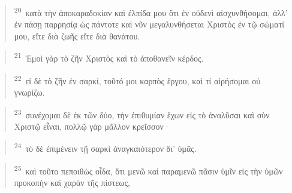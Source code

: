 \documentclass{article}
\newcommand{\currentverse}{1} %
\newcommand{\setcurrentverse}[1]{\renewcommand{\currentverse}{#1}}
\begin{document}
\begin{verse}

\setcurrentverse{20}

\setcounter{footnote}{0}

\textsuperscript{20}~κατὰ τὴν ἀποκαραδοκίαν καὶ ἐλπίδα μου ὅτι ἐν οὐδενὶ αἰσχυνθήσομαι, ἀλλ’ ἐν πάσῃ παρρησίᾳ ὡς πάντοτε καὶ νῦν μεγαλυνθήσεται Χριστὸς ἐν τῷ σώματί μου, εἴτε διὰ ζωῆς εἴτε διὰ θανάτου.

\end{verse}

\begin{verse}

\setcurrentverse{21}

\setcounter{footnote}{0}

\textsuperscript{21}~Ἐμοὶ γὰρ τὸ ζῆν Χριστὸς καὶ τὸ ἀποθανεῖν κέρδος.

\end{verse}

\begin{verse}

\setcurrentverse{22}

\setcounter{footnote}{0}

\textsuperscript{22}~εἰ δὲ τὸ ζῆν ἐν σαρκί, τοῦτό μοι καρπὸς ἔργου, καὶ τί αἱρήσομαι οὐ γνωρίζω.

\end{verse}

\begin{verse}

\setcurrentverse{23}

\setcounter{footnote}{0}

\textsuperscript{23}~συνέχομαι δὲ ἐκ τῶν δύο, τὴν ἐπιθυμίαν ἔχων εἰς τὸ ἀναλῦσαι καὶ σὺν Χριστῷ εἶναι, πολλῷ γὰρ μᾶλλον κρεῖσσον·

\end{verse}

\begin{verse}

\setcurrentverse{24}

\setcounter{footnote}{0}

\textsuperscript{24}~τὸ δὲ ἐπιμένειν τῇ σαρκὶ ἀναγκαιότερον δι’ ὑμᾶς.

\end{verse}

\begin{verse}

\setcurrentverse{25}

\setcounter{footnote}{0}

\textsuperscript{25}~καὶ τοῦτο πεποιθὼς οἶδα, ὅτι μενῶ καὶ παραμενῶ πᾶσιν ὑμῖν εἰς τὴν ὑμῶν προκοπὴν καὶ χαρὰν τῆς πίστεως,

\end{verse}
\end{document}
